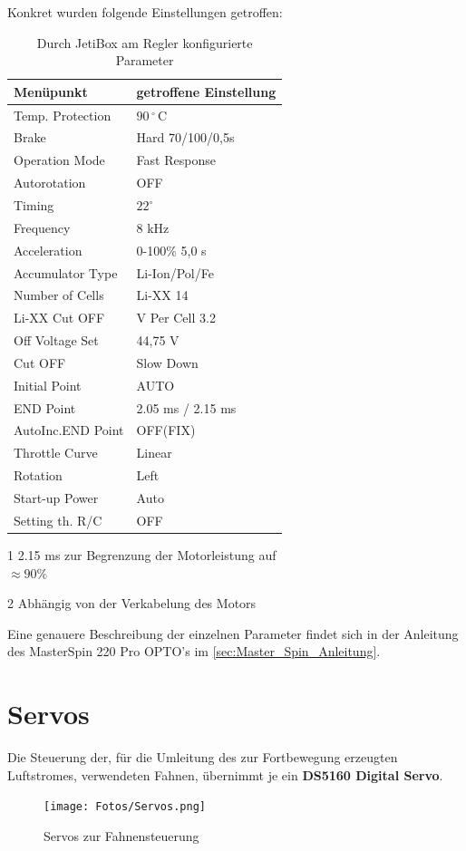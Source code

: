 Konkret wurden folgende Einstellungen getroffen:\\
\begin{table}[h]
\centering
\begin{threeparttable}
    
    \begin{tabular}{|l|l|}
    \hline
     Menüpunkt & getroffene Einstellung \\\hline
     Temp. Protection & $90\,^\circ\,\textrm{C}$\\
     Brake & Hard 70/100/0,5s\\
     Operation Mode & Fast Response\\
     Autorotation & OFF\\
     Timing & $22^\circ$\\
     Frequency & 8 kHz\\
     Acceleration & 0-100\% 5,0 s\\
     Accumulator Type & Li-Ion/Pol/Fe\\
     Number of Cells & Li-XX 14\\
     Li-XX Cut OFF & V Per Cell 3.2\\
     Off Voltage Set & 44,75 V\\
     Cut OFF & Slow Down\\
     Initial Point & AUTO\\
     END Point & 2.05 ms / 2.15 ms \tnote{1}\\
     AutoInc.END Point & OFF(FIX)\\
     Throttle Curve & Linear\\
     Rotation & Left \tnote{2}\\
     Start-up Power & Auto\\
     Setting th. R/C & OFF\\\hline
    \end{tabular}
    \begin{tablenotes}\footnotesize 
        \item[1] 2.15 ms zur Begrenzung der Motorleistung auf \\$\approx 90\%$
        \item[2] Abhängig von der Verkabelung des Motors 
        \end{tablenotes}
    \end{threeparttable}
    \caption{Durch JetiBox am Regler konfigurierte Parameter}
\end{table}

Eine genauere Beschreibung der einzelnen Parameter findet sich in der Anleitung des MasterSpin 220 Pro OPTO's im \autoref{sec:Master_Spin_Anleitung}.

\newpage
\section{Servos}
Die Steuerung der, für die Umleitung des zur Fortbewegung erzeugten Luftstromes, verwendeten Fahnen, übernimmt je ein \textbf{DS5160 Digital Servo}.
\begin{figure}[h]
    \centering
    \texttt{[image: Fotos/Servos.png]}
    \caption{Servos zur Fahnensteuerung}
\end{figure}

\newpage